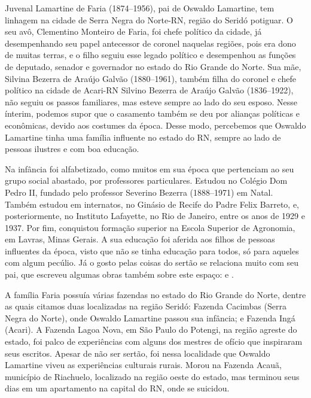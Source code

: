 \begin{refsection}
    Juvenal Lamartine de Faria (1874--1956), pai de Oswaldo Lamartine, tem linhagem na cidade de Serra Negra do Norte-RN, região do Seridó potiguar. O seu avô, Clementino Monteiro de Faria, foi chefe político da cidade, já desempenhando seu papel antecessor de coronel naquelas regiões, pois era dono de muitas terras, e o filho seguiu esse legado político e desempenhou as funções de deputado, senador e governador no estado do Rio Grande do Norte. Sua mãe, Silvina Bezerra de Araújo Galvão (1880--1961), também filha do coronel e chefe político na cidade de Acari-RN Silvino Bezerra de Araújo Galvão (1836--1922), não seguiu os passos familiares, mas esteve sempre ao lado do seu esposo. Nesse ínterim, podemos supor que o casamento também se deu por alianças políticas e econômicas, devido aos costumes da época. Desse modo, percebemos que Oswaldo Lamartine tinha uma família influente no estado do RN, sempre ao lado de pessoas ilustres e com boa educação.  

    Na infância foi alfabetizado, como muitos em sua época que pertenciam ao seu grupo social abastado, por professores particulares. Estudou no Colégio Dom Pedro II, fundado pelo professor Severino Bezerra (1888--1971) em Natal. Também estudou em internatos, no Ginásio de Recife do Padre Felix Barreto, e, posteriormente, no Instituto Lafayette, no Rio de Janeiro, entre os anos de 1929 e 1937. Por fim, conquistou formação superior na Escola Superior de Agronomia, em Lavras, Minas Gerais. A sua educação foi aferida aos filhos de pessoas influentes da época, visto que não se tinha educação para todos, só para aqueles com algum pecúlio. Já o gosto pelas coisas do sertão se relaciona muito com seu pai, que escreveu algumas obras também sobre este espaço:  e . 

    A família Faria possuía várias fazendas no estado do Rio Grande do Norte, dentre as quais citamos duas localizadas na região Seridó: Fazenda Cacimbas (Serra Negra do Norte), onde Oswaldo Lamartine passou sua infância; e Fazenda Ingá (Acari). A Fazenda Lagoa Nova, em São Paulo do Potengi, na região agreste do estado, foi palco de experiências com alguns dos mestres de ofício que inspiraram seus escritos. Apesar de não ser sertão, foi nessa localidade que Oswaldo Lamartine viveu as experiências culturais rurais. Morou na Fazenda Acauã, município de Riachuelo, localizado na região oeste do estado, mas terminou seus dias em um apartamento na capital do RN, onde se suicidou. 


\end{refsection}
